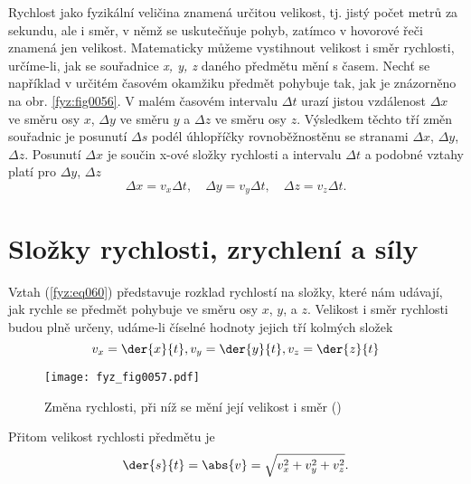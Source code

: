     Rychlost jako fyzikální veličina znamená určitou velikost, tj. jistý počet metrů za sekundu, 
    ale i směr, v němž se uskutečňuje pohyb, zatímco v hovorové řeči znamená jen velikost. 
    Matematicky můžeme vystihnout velikost i směr rychlosti, určíme-li, jak se souřadnice \emph{x, 
    y, z} daného předmětu mění s časem. Nechť se například v určitém časovém okamžiku předmět 
    pohybuje tak, jak je znázorněno na obr. \ref{fyz:fig0056}. V malém časovém intervalu \(\Delta 
    t\) urazí jistou vzdálenost \(\Delta x\) ve směru osy \(x\), \(\Delta y\) ve směru \(y\) a 
    \(\Delta z\) ve směru osy \(z\). Výsledkem těchto tří změn souřadnic je posunutí \(\Delta s\) 
    podél úhlopříčky rovnoběžnostěnu se stranami \(\Delta x\), \(\Delta y\), \(\Delta z\). Posunutí 
    \(\Delta x\) je součin x-ové složky rychlosti a intervalu \(\Delta t\) a podobné vztahy platí 
    pro \(\Delta y\), \(\Delta z\)
    \begin{equation}\label{fyz:eq060}
      \Delta x = v_x\Delta t,\quad \Delta y = v_y\Delta t,\quad \Delta z = v_z\Delta t.
    \end{equation}
    
  \section{Složky rychlosti, zrychlení a síly}\label{fyz:IchapIXsecIII}
    Vztah (\ref{fyz:eq060}) představuje rozklad rychlostí na složky, které nám udávají, jak rychle 
    se předmět pohybuje ve směru osy \(x\), \(y\), a \(z\). Velikost i směr rychlosti budou plně 
    určeny, udáme-li číselné hodnoty jejich tří kolmých složek
    \begin{equation}\label{fyz:eq061}
      v_x = \der{x}{t}, v_y = \der{y}{t}, v_z = \der{z}{t}
    \end{equation}

    \begin{figure}[ht!]  %
      \centering
      \texttt{[image: fyz\_fig0057.pdf]}
      \caption{Změna rychlosti, při níž se mění její velikost i směr (\cite[s.~125]{Feynman01})}
      \label{fyz:fig0057}
    \end{figure}
    
    Přitom velikost rychlosti předmětu je
    \begin{equation}\label{fyz:eq062}
      \der{s}{t} = \abs{v} = \sqrt{v^2_x + v^2_y + v^2_z}. 
    \end{equation}
    
